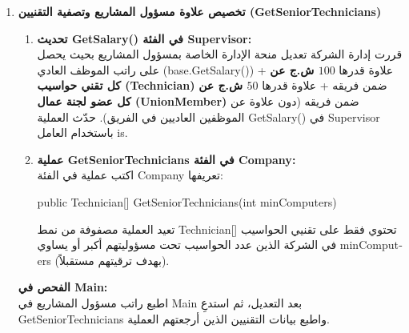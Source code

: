 \documentclass[14pt]{extarticle}
\begin{document}
\begin{enumerate}[resume, label=\textbf{تمرين \arabic*:}, wide=0pt, leftmargin=*, itemsep=2em]

    \item \textbf{تخصيص علاوة مسؤول المشاريع وتصفية التقنيين (\textenglish{GetSeniorTechnicians})}
    \begin{enumerate}[label=\textbf{(\arabic*)}]
        \item \textbf{تحديث \textenglish{GetSalary()} في الفئة \textenglish{Supervisor}:} \\
        قررت إدارة الشركة تعديل منحة الإدارة الخاصة بمسؤول المشاريع بحيث يحصل على راتب الموظف العادي (\textenglish{base.GetSalary()}) + علاوة قدرها \textbf{$100$ ش.ج عن كل تقني حواسيب (\textenglish{Technician})} ضمن فريقه + علاوة قدرها \textbf{$50$ ش.ج عن كل عضو لجنة عمال (\textenglish{UnionMember})} ضمن فريقه (دون علاوة عن الموظفين العاديين في الفريق). حدّث العملية \textenglish{GetSalary()} في \textenglish{Supervisor} باستخدام العامل \textenglish{is}.
        \item \textbf{عملية \textenglish{GetSeniorTechnicians} في الفئة \textenglish{Company}:} \\
        اكتب عملية في الفئة \textenglish{Company} تعريفها:
        \begin{center}
        \textenglish{public Technician[] GetSeniorTechnicians(int minComputers)}
        \end{center}
        تعيد العملية مصفوفة من نمط \textenglish{Technician[]} تحتوي فقط على تقنيي الحواسيب في الشركة الذين عدد الحواسيب تحت مسؤوليتهم أكبر أو يساوي \textenglish{minComputers} (بهدف ترقيتهم مستقبلاً).
    \end{enumerate}
    \textbf{الفحص في \textenglish{Main}:} \\
    اطبع راتب مسؤول المشاريع في \textenglish{Main} بعد التعديل، ثم استدعِ \textenglish{GetSeniorTechnicians} واطبع بيانات التقنيين الذين أرجعتهم العملية.


\end{enumerate}
\end{document}
